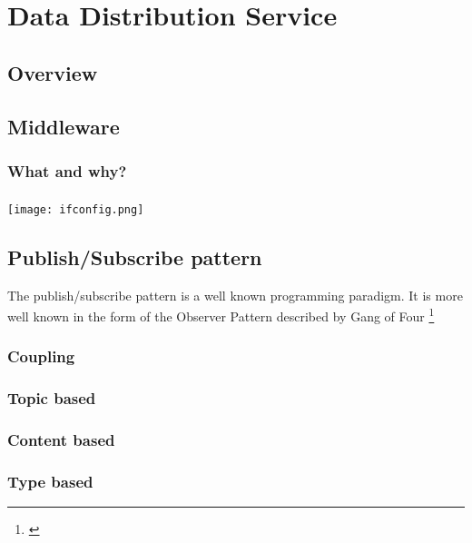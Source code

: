 \chapter{Data Distribution Service}
\section{Overview}


\section{Middleware}
\subsection{What and why?}


\subsection{}

\begin{center}
	\texttt{[image: ifconfig.png]}
\end{center}



\section{Publish/Subscribe pattern}
The publish/subscribe pattern is a well known programming paradigm. It is more well known in the form of the Observer Pattern described by Gang of Four \footnote{\citep{DesignPatterns}}



\subsection{Coupling}


\subsection{Topic based}
\subsection{Content based}
\subsection{Type based}


